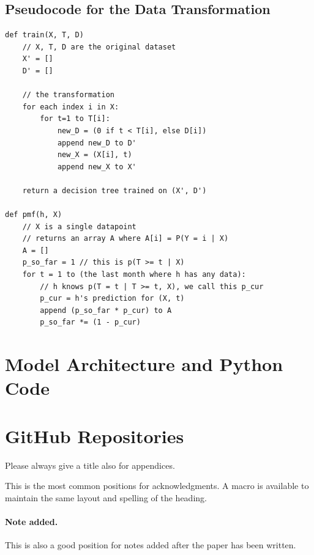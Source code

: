 \documentclass[a4paper,11pt]{article}
\begin{document}
\subsection{Pseudocode for the Data Transformation}
\label{subsec:pseudocode}

\begin{verbatim}
def train(X, T, D)
    // X, T, D are the original dataset
    X' = []
    D' = []

    // the transformation
    for each index i in X:
        for t=1 to T[i]:
            new_D = (0 if t < T[i], else D[i])
            append new_D to D'
            new_X = (X[i], t)
            append new_X to X'

    return a decision tree trained on (X', D')

def pmf(h, X)
    // X is a single datapoint
    // returns an array A where A[i] = P(Y = i | X)
    A = []
    p_so_far = 1 // this is p(T >= t | X)
    for t = 1 to (the last month where h has any data):
        // h knows p(T = t | T >= t, X), we call this p_cur
        p_cur = h's prediction for (X, t)
        append (p_so_far * p_cur) to A
        p_so_far *= (1 - p_cur)

\end{verbatim}




\section{Model Architecture and Python Code}
\section{GitHub Repositories}
Please always give a title also for appendices.





\acknowledgments

This is the most common positions for acknowledgments. A macro is
available to maintain the same layout and spelling of the heading.

\paragraph{Note added.} This is also a good position for notes added
after the paper has been written.





\end{document}
